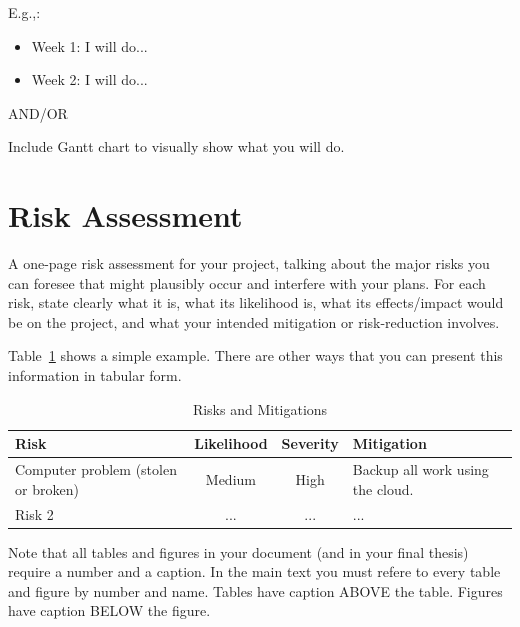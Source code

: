 \documentclass{article}
\begin{document}
E.g.,:
\begin{itemize}
    \item Week 1: I will do...
    \item Week 2: I will do...
\end{itemize}

AND/OR

Include Gantt chart to visually show what you will do.


\newpage

\section{Risk Assessment}

A one-page risk assessment for your project, talking about the major risks you can foresee that might plausibly occur and interfere with your plans. For each risk, state clearly what it is, what its likelihood is, what its effects/impact would be on the project, and what your intended mitigation or risk-reduction involves. 

Table~\ref{tab:my_label} shows a simple example. There are other ways that you can present this information in tabular form.

\begin{table}[h]
    \centering
    \caption{Risks and Mitigations}
    \label{tab:my_label}
    \begin{tabular}{|p{3cm}|c|c|p{3cm}|}
        \hline
         Risk & Likelihood & Severity & Mitigation \\ \hline
         Computer problem (stolen or broken) & Medium & High & Backup all work using the cloud.\\ \hline
         Risk 2 & ... & ... & ...\\ \hline
    \end{tabular}
\end{table}

Note that all tables and figures in your document (and in your final thesis) require a number and a caption. In the main text you must refere to every table and figure by number and name. Tables have caption ABOVE the table. Figures have caption BELOW the figure. 
\end{document}
